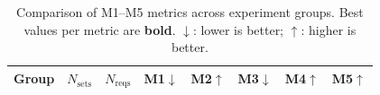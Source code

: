 \begin{table}[htbp]
\centering
\caption{Comparison of M1--M5 metrics across experiment groups. Best values per metric are \textbf{bold}. $\downarrow$: lower is better; $\uparrow$: higher is better.}
\label{tab:metrics}
\setlength{\tabcolsep}{5pt}
\begin{tabular}{l r r r r r r r }
\toprule
Group & $N_\text{sets}$ & $N_\text{reqs}$ & M1$\downarrow$ & M2$\uparrow$ & M3$\downarrow$ & M4$\uparrow$ & M5$\uparrow$ \\
\midrule
\bottomrule
\end{tabular}
\end{table}